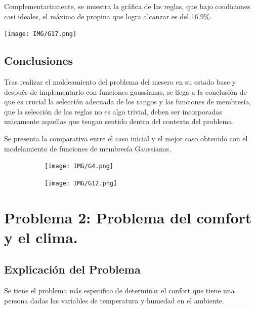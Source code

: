 \documentclass[11pt, letterpaper]{article}
\begin{document}
	\newpage
	
	Complementariamente, se muestra la gráfica de las reglas, que bajo condiciones casi ideales, el máximo de propina que logra alcanzar es del 16.9\%.
	
	\texttt{[image: IMG/G17.png]}
	
	\subsection{Conclusiones}
	
	Tras realizar el moldeamiento del problema del mesero en su estado base y después de implementarlo con funciones gaussianas, se llega a la conclusión de que es crucial la selección adecuada de los rangos y las funciones de membresía, que la selección de las reglas no es algo trivial, deben ser incorporadas unicamente aquellas que tengan sentido dentro del contexto del problema.
	
	Se presenta la comparativa entre el caso inicial y el mejor caso obtenido con el modelamiento de funciones de membresía Gaussianas.
	
	\begin{figure}[h]
		\centering
		\begin{subfigure}{0.42\textwidth} %
			\centering
			\texttt{[image: IMG/G4.png]}
			\label{fig:G111}
		\end{subfigure}
		\hfill
		\begin{subfigure}{0.42\textwidth} %
			\centering
			\texttt{[image: IMG/G12.png]}
			\label{fig:G112}
		\end{subfigure}
		\label{fig:comparacion2}
	\end{figure}
	
	
	
	\newpage
	
	
	\section{Problema 2: Problema del comfort y el clima.}
	
	\subsection{Explicación del Problema}
	
	Se tiene el problema más especifico de determinar el confort que tiene una persona dadas las variables  de temperatura y humedad en el ambiente.
	
\end{document}
